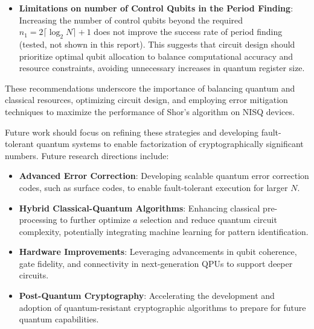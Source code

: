\documentclass[conference,twoside]{IEEEtran}
\begin{document}
\begin{itemize}
    \item \textbf{Limitations on number of Control Qubits in the Period Finding}: Increasing the number of control qubits beyond the required $n_1 = 2\lceil \log_2 N \rceil + 1$ does not improve the success rate of period finding (tested, not shown in this report). This suggests that circuit design should prioritize optimal qubit allocation to balance computational accuracy and resource constraints, avoiding unnecessary increases in quantum register size.
\end{itemize}

These recommendations underscore the importance of balancing quantum and classical resources, optimizing circuit design, and employing error mitigation techniques to maximize the performance of Shor's algorithm on NISQ devices. 

Future work should focus on refining these strategies and developing fault-tolerant quantum systems to enable factorization of cryptographically significant numbers. Future research directions include:

\begin{itemize}
    \item \textbf{Advanced Error Correction}: Developing scalable quantum error correction codes, such as surface codes, to enable fault-tolerant execution for larger $N$.
    \item \textbf{Hybrid Classical-Quantum Algorithms}: Enhancing classical pre-processing to further optimize $a$ selection and reduce quantum circuit complexity, potentially integrating machine learning for pattern identification.
    \item \textbf{Hardware Improvements}: Leveraging advancements in qubit coherence, gate fidelity, and connectivity in next-generation QPUs to support deeper circuits.
    \item \textbf{Post-Quantum Cryptography}: Accelerating the development and adoption of quantum-resistant cryptographic algorithms to prepare for future quantum capabilities.
\end{itemize}
\end{document}
